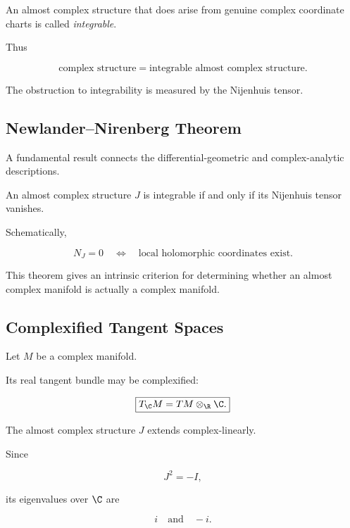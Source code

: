 An almost complex structure that does arise from genuine complex coordinate
charts is called \emph{integrable}.

Thus

\[
\boxed{
\text{complex structure}
=
\text{integrable almost complex structure}.
}
\]

The obstruction to integrability is measured by the Nijenhuis tensor.

\subsection{Newlander--Nirenberg Theorem}
\label{subsec:newlander-nirenberg}

A fundamental result connects the differential-geometric and
complex-analytic descriptions.

\begin{theorem}
An almost complex structure \(J\) is integrable if and only if its Nijenhuis
tensor vanishes.
\end{theorem}

Schematically,

\[
\boxed{
N_J=0
\quad\Longleftrightarrow\quad
\text{local holomorphic coordinates exist}.
}
\]

This theorem gives an intrinsic criterion for determining whether an almost
complex manifold is actually a complex manifold.

\subsection{Complexified Tangent Spaces}
\label{subsec:complexified-tangent-spaces}

Let \(M\) be a complex manifold.

Its real tangent bundle may be complexified:

\[
\boxed{
T_{\C}M
=
TM\otimes_{\R}\C.
}
\]

The almost complex structure \(J\) extends complex-linearly.

Since

\[
J^2=-I,
\]

its eigenvalues over \(\C\) are

\[
\boxed{i\quad\text{and}\quad -i.}
\]

